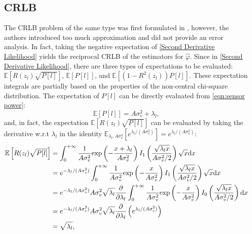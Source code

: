 \documentclass[12pt,draftclsnofoot,journal,onecolumn]{IEEEtran}
\theoremstyle{nonumberplain}
\def \exp {\text{exp}}
\begin{document}
\subsection{CRLB}
    The CRLB problem of the same type was first formulated in \cite{jiang2016cramer}, however, the authors introduced too much approximation and did not provide an error analysis. In fact, taking the negative expectation of \eqref{Second Derivative Likelihood} yields the reciprocal CRLB of the estimators for $\hat{\varphi}$. Since in \eqref{Second Derivative Likelihood}, there are three types of expectations to be evaluated: $\mathbb{E}\left[R(z_l)\sqrt{P[l]}\right]$, $\mathbb{E}\left[P[l]\right]$, and $\mathbb{E}\left[(1-R^2(z_l))P[l]\right]$. These expectation integrals are partially based on the properties of the non-central chi-square distribution. The expectation of $P[l]$ can be directly evaluated from \eqref{eqn:sensor power}:
    \begin{equation}
        \mathbb{E}\left[P[l]\right] = A\sigma_v^2 + \lambda_l,
        \label{eqn:expectation of P_l}
    \end{equation}
    and, in fact, the expectation $\mathbb{E}\left[R(z_l) \sqrt{P[l]}\right]$ can be evaluated by taking the derivative w.r.t $\lambda_l$ in the identity $\mathbb{E}_{\lambda_l, A\sigma_v^2}[e^{\lambda_l/(A\sigma_v^2)}]=e^{\lambda_l/(A\sigma_v^2)}$:
    \begin{equation}
        \begin{aligned}
            \mathbb{E}\left[R(z_l) \sqrt{P[l]}\right] & = \int_{0}^{+\infty}{\frac{1}{A\sigma_v^2}\exp\left(-\frac{x+\lambda_l}{A\sigma_v^2}\right)I_1\left(\frac{\sqrt{\lambda_l x}}{A\sigma_v^2/2}\right)\sqrt{x}{\rm d}x}\\
            & = e^{-\lambda_l/(A\sigma_v^2)}\int_{0}^{+\infty}{\frac{1}{A\sigma_v^2}\exp\left(-\frac{x}{A\sigma_v^2}\right)I_1\left(\frac{\sqrt{\lambda_l x}}{A\sigma_v^2/2}\right)\sqrt{x}{\rm d}x} \\
            & = e^{-\lambda_l/(A\sigma_v^2)} A\sigma_v^2 \sqrt{\lambda_l} \frac{\partial}{\partial\lambda_l} \int_{0}^{+\infty}{\frac{1}{A\sigma_v^2}\exp\left(-\frac{x}{A\sigma_v^2}\right)I_0\left(\frac{\sqrt{\lambda_l x}}{A\sigma_v^2/2}\right) {\rm d}x}\\
            & = e^{-\lambda_l/(A\sigma_v^2)} A\sigma_v^2 \sqrt{\lambda_l} \frac{\partial}{\partial\lambda_l} \left(e^{\lambda_l/(A\sigma_v^2)}\right)\\
            & = \sqrt{\lambda_l},\\
        \end{aligned}
    \end{equation}
\end{document}

